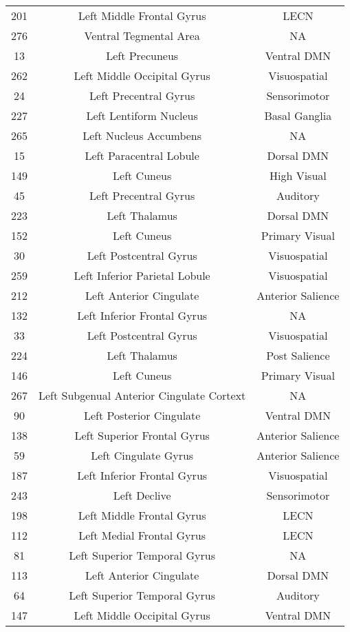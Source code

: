 \documentclass[10pt,letterpaper]{article}\usepackage[]{graphicx}\usepackage[]{color}
\begin{document}
\begin{center}
\begin{longtable}[c]{ccc}
		201	& Left Middle Frontal Gyrus	& LECN \\
		276	& Ventral Tegmental Area & NA \\
		13 & Left Precuneus	& Ventral DMN \\
		262	& Left Middle Occipital Gyrus & Visuospatial \\
		24 & Left Precentral Gyrus & Sensorimotor \\
		227	& Left Lentiform Nucleus & Basal Ganglia \\
		265	& Left Nucleus Accumbens & NA \\
		15 & Left Paracentral Lobule & Dorsal DMN \\
		149	& Left Cuneus & High Visual \\
		45 & Left Precentral Gyrus & Auditory \\
		223	& Left Thalamus	& Dorsal DMN \\
		152	& Left Cuneus & Primary Visual \\
		30 & Left Postcentral Gyrus	& Visuospatial \\
		259	& Left Inferior Parietal Lobule	& Visuospatial \\
		212	& Left Anterior Cingulate & Anterior Salience \\
		132	& Left Inferior Frontal Gyrus & NA \\
		33 & Left Postcentral Gyrus	& Visuospatial \\
		224	& Left Thalamus	& Post Salience \\
		146	& Left Cuneus & Primary Visual \\
		267	& Left Subgenual Anterior Cingulate Cortext	& NA \\
		90 & Left Posterior Cingulate & Ventral DMN \\
		138	& Left Superior Frontal Gyrus & Anterior Salience \\
		59 & Left Cingulate Gyrus & Anterior Salience \\
		187	& Left Inferior Frontal Gyrus & Visuospatial \\
		243	& Left Declive & Sensorimotor \\
		198	& Left Middle Frontal Gyrus	& LECN \\
		112	& Left Medial Frontal Gyrus	& LECN \\
		81 & Left Superior Temporal Gyrus & NA \\
		113	& Left Anterior Cingulate & Dorsal DMN \\
		64 & Left Superior Temporal Gyrus & Auditory \\
		147	& Left Middle Occipital Gyrus & Ventral DMN \\

\end{longtable}
\end{center}
\end{document}
